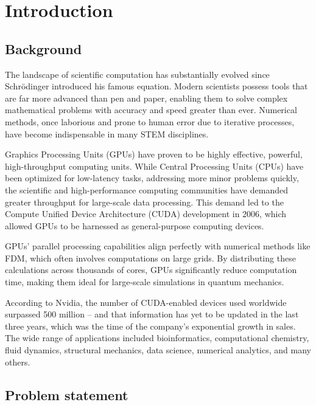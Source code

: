 \section{Introduction}

\subsection{Background}

The landscape of scientific computation has substantially evolved since Schrödinger introduced his famous equation. Modern scientists possess tools that are far more advanced than pen and paper, enabling them to solve complex mathematical problems with accuracy and speed greater than ever. Numerical methods, once laborious and prone to human error due to iterative processes, have become indispensable in many STEM disciplines.

Graphics Processing Units (GPUs) have proven to be highly effective, powerful, high-throughput computing units. While Central Processing Units (CPUs) have been optimized for low-latency tasks, addressing more minor problems quickly, the scientific and high-performance computing communities have demanded greater throughput for large-scale data processing. This demand led to the Compute Unified Device Architecture (CUDA) development in 2006, which allowed GPUs to be harnessed as general-purpose computing devices.

GPUs' parallel processing capabilities align perfectly with numerical methods like FDM, which often involves computations on large grids. By distributing these calculations across thousands of cores, GPUs significantly reduce computation time, making them ideal for large-scale simulations in quantum mechanics.

According to Nvidia, the number of CUDA-enabled devices used worldwide surpassed 500 million -- and that information has yet to be updated in the last three years, which was the time of the company's exponential growth in sales. The wide range of applications included bioinformatics, computational chemistry, fluid dynamics, structural mechanics, data science, numerical analytics, and many others.\cite{cuda} 	

\subsection{Problem statement}

